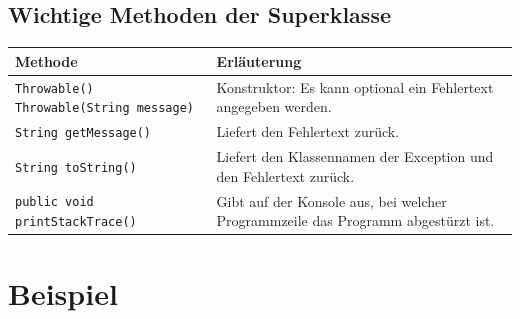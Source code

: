 \subsection{Wichtige Methoden der Superklasse }

\bgroup
\def\arraystretch{1.2}
\begin{tabularx}{\textwidth}{|p{60mm}|X|}
\hline
\textbf{Methode} & \textbf{Erläuterung}
\\ \hline
\texttt{Throwable()}\newline
\texttt{Throwable(String message)} & 
Konstruktor: Es kann optional ein Fehlertext angegeben werden.
\\ \hline
\texttt{String getMessage()} &
Liefert den Fehlertext zurück.
\\ \hline
\texttt{String toString()} &
Liefert den Klassennamen der Exception und den Fehlertext zurück.
\\ \hline
\texttt{public void printStackTrace()} &
Gibt auf der Konsole aus, bei welcher Programmzeile das Programm abgestürzt ist.
\\ \hline
\end{tabularx}
\egroup


\section{Beispiel}

